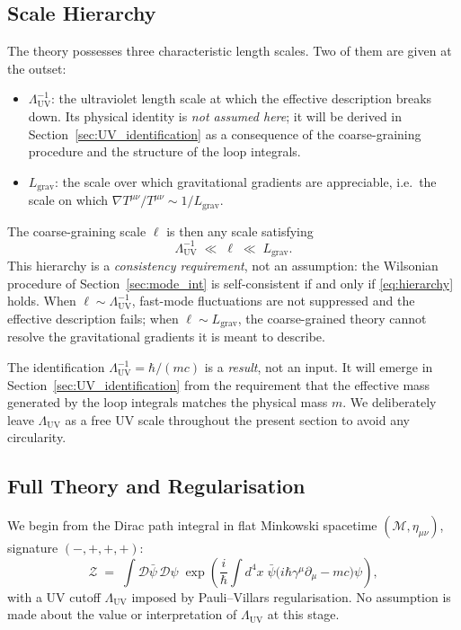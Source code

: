 \documentclass[11pt,a4paper]{article}
\theoremstyle{definition}
\theoremstyle{remark}
\begin{document}
	\subsection{Scale Hierarchy}
	
	The theory possesses three characteristic length scales.  Two of them are
	given at the outset:
	\begin{itemize}
		\item $\Lambda_{\mathrm{UV}}^{-1}$: the ultraviolet length scale at which
		the effective description breaks down.  Its physical identity is
		\emph{not assumed here}; it will be derived in
		Section~\ref{sec:UV_identification} as a consequence of the
		coarse-graining procedure and the structure of the loop integrals.
		
		\item $L_{\mathrm{grav}}$: the scale over which gravitational gradients
		are appreciable, i.e.\ the scale on which $\nabla T^{\mu\nu}/T^{\mu\nu}
		\sim 1/L_{\mathrm{grav}}$.
	\end{itemize}
	The coarse-graining scale $\ell$ is then any scale satisfying
	\begin{equation}
		\Lambda_{\mathrm{UV}}^{-1} \;\ll\; \ell \;\ll\; L_{\mathrm{grav}}.
		\label{eq:hierarchy}
	\end{equation}
	This hierarchy is a \emph{consistency requirement}, not an assumption: the
	Wilsonian procedure of Section~\ref{sec:mode_int} is self-consistent if and
	only if \eqref{eq:hierarchy} holds.  When $\ell \sim \Lambda_{\mathrm{UV}}^{-1}$,
	fast-mode fluctuations are not suppressed and the effective description fails;
	when $\ell \sim L_{\mathrm{grav}}$, the coarse-grained theory cannot resolve
	the gravitational gradients it is meant to describe.
	
		The identification $\Lambda_{\mathrm{UV}}^{-1} = \hbar/(mc)$ is a \emph{result},
		not an input.  It will emerge in Section~\ref{sec:UV_identification} from the
		requirement that the effective mass generated by the loop integrals matches the
		physical mass $m$.  We deliberately leave $\Lambda_{\mathrm{UV}}$ as a free
		UV scale throughout the present section to avoid any circularity.
	
	\subsection{Full Theory and Regularisation}
	
	We begin from the Dirac path integral in flat Minkowski spacetime
	$(\mathcal{M}, \eta_{\mu\nu})$, signature $(-,+,+,+)$:
	\begin{equation}
		\mathcal{Z} \;=\;
		\int \mathcal{D}\bar{\psi}\,\mathcal{D}\psi\;
		\exp\!\left(\frac{i}{\hbar}
		\int d^4x\;
		\bar{\psi}\bigl(i\hbar\gamma^\mu\partial_\mu - mc\bigr)\psi
		\right),
		\label{eq:path_integral}
	\end{equation}
	with a UV cutoff $\Lambda_{\mathrm{UV}}$ imposed by Pauli--Villars
	regularisation.  No assumption is made about the value or interpretation of
	$\Lambda_{\mathrm{UV}}$ at this stage.
	
\end{document}
